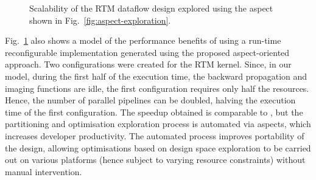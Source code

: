 \begin{figure}[!h]
  \centering
  \caption{Scalability of the RTM dataflow design explored using the aspect
    shown in Fig.~\ref{fig:aspect-exploration}.}
  \label{fig:scalability}
\end{figure}



Fig.~\ref{fig:scalability} also shows a model of the performance
benefits of using a run-time reconfigurable implementation generated
using the proposed aspect-oriented approach. Two configurations were
created for the RTM \FAST{} kernel. Since, in our model, during the
first half of the execution time, the backward propagation and imaging
functions are idle, the first configuration requires only half the
resources. Hence, the number of parallel pipelines can be doubled,
halving the execution time of the first configuration. The speedup
obtained is comparable to \cite{Xinyu:Qiwei:Luk:Qiang:Pell:2012}, but
the partitioning and optimisation exploration process is automated via
aspects, which increases developer productivity. The automated process
improves portability of the design, allowing optimisations based on
design space exploration to be carried out on various platforms (hence
subject to varying resource constraints) without manual intervention.

